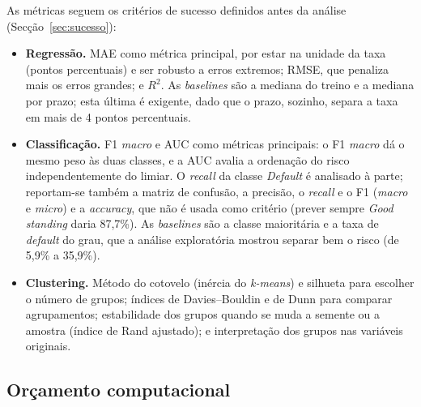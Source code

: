As métricas seguem os critérios de sucesso definidos antes da análise (Secção~\ref{sec:sucesso}):
\begin{itemize}
  \item \textbf{Regressão.} MAE como métrica principal, por estar na unidade da taxa (pontos percentuais) e ser robusto a erros extremos; RMSE, que penaliza mais os erros grandes; e $R^2$. As \textit{baselines} são a mediana do treino e a mediana por prazo; esta última é exigente, dado que o prazo, sozinho, separa a taxa em mais de 4 pontos percentuais.
  \item \textbf{Classificação.} F1 \textit{macro} e AUC como métricas principais: o F1 \textit{macro} dá o mesmo peso às duas classes, e a AUC avalia a ordenação do risco independentemente do limiar. O \textit{recall} da classe \textit{Default} é analisado à parte; reportam-se também a matriz de confusão, a precisão, o \textit{recall} e o F1 (\textit{macro} e \textit{micro}) e a \textit{accuracy}, que não é usada como critério (prever sempre \textit{Good standing} daria 87,7\%). As \textit{baselines} são a classe maioritária e a taxa de \textit{default} do grau, que a análise exploratória mostrou separar bem o risco (de 5,9\% a 35,9\%).
  \item \textbf{Clustering.} Método do cotovelo (inércia do \textit{k-means}) e silhueta para escolher o número de grupos; índices de Davies--Bouldin e de Dunn para comparar agrupamentos; estabilidade dos grupos quando se muda a semente ou a amostra (índice de Rand ajustado); e interpretação dos grupos nas variáveis originais.
\end{itemize}


\subsection{Orçamento computacional}

